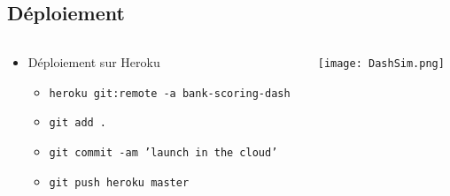 \documentclass[8pt,aspectratio=169,hyperref={unicode=true}]{beamer}
\begin{document}
\subsection{Déploiement}
\begin{frame}{\insertsection}{\insertsubsection}
    \begin{columns}
        \begin{column}{.4\textwidth}
            \begin{itemize}
                \item Déploiement sur Heroku
                      \begin{itemize}
                          \item \texttt{heroku git:remote -a bank-scoring-dash}
                          \item \texttt{git add .}
                          \item \texttt{git commit -am 'launch in the cloud'}
                          \item \texttt{git push heroku master}
                      \end{itemize}
            \end{itemize}
        \end{column}
        \begin{column}{.6\textwidth}
            \texttt{[image: DashSim.png]}
        \end{column}
    \end{columns}
\end{frame}

\end{document}

